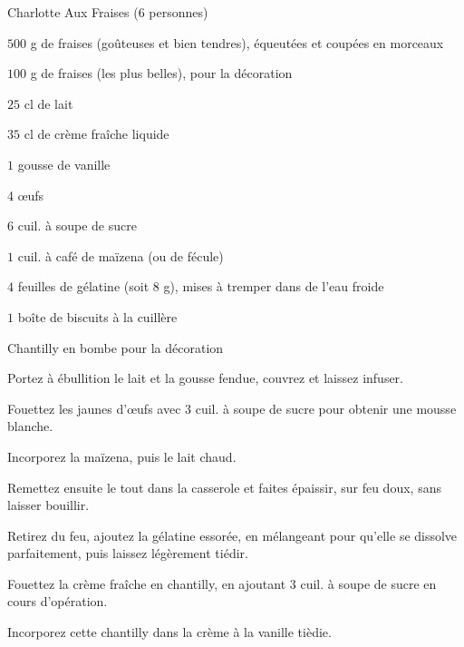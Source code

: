 \begin{recette}{Charlotte Aux Fraises (6 personnes)}
\begin{ingredients}
\item $500$ g de fraises (goûteuses et bien tendres), équeutées et coupées en morceaux
\item $100$ g de fraises (les plus belles), pour la décoration
\item $25$ cl de lait
\item $35$ cl de crème fraîche liquide
\item $1$ gousse de vanille
\item 4 œufs
\item $6$ cuil. à soupe de sucre
\item $1$ cuil. à café de maïzena (ou de fécule)
\item $4$ feuilles de gélatine (soit 8 g), mises à tremper dans de l'eau froide
\item $1$ boîte de biscuits à la cuillère
\item Chantilly en bombe pour la décoration
\end{ingredients}

\begin{preparation}
\item[Commencez par confectionner la garniture de la charlotte]
\item Portez à ébullition le lait et la gousse fendue, couvrez et laissez infuser.
\item Fouettez les jaunes d'œufs avec 3 cuil. à soupe de sucre pour obtenir une mousse blanche.
\item Incorporez la maïzena, puis le lait chaud.
\item Remettez ensuite le tout dans la casserole et faites épaissir, sur feu doux, sans laisser bouillir.
\item Retirez du feu, ajoutez la gélatine essorée, en mélangeant pour qu'elle se dissolve parfaitement, puis laissez légèrement tiédir.
\item Fouettez la crème fraîche en chantilly, en ajoutant 3 cuil. à soupe de sucre en cours d'opération.
\item Incorporez cette chantilly dans la crème à la vanille tièdie.


\end{preparation}
\end{recette}
